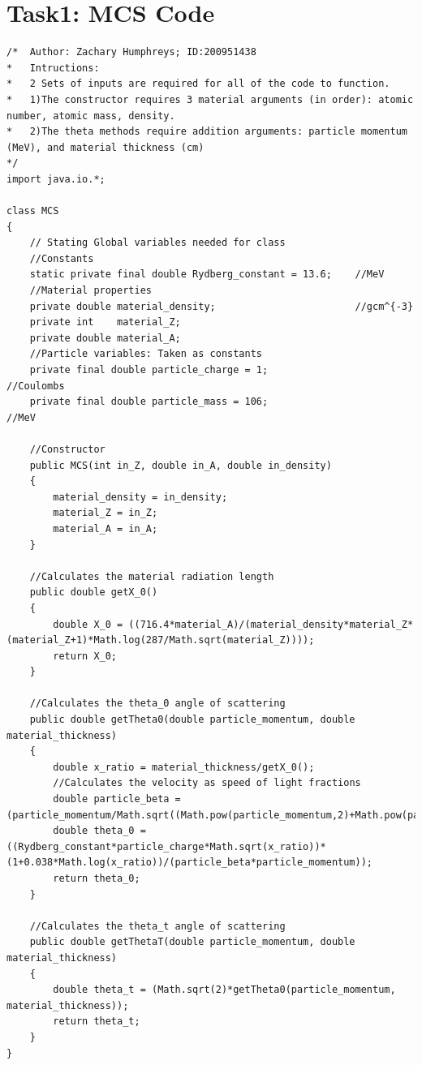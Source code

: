 \documentclass[twocolumn]{article}
\begin{document}
\section{Task1: MCS Code}
\begin{verbatim}
/*  Author: Zachary Humphreys; ID:200951438
*   Intructions: 
*   2 Sets of inputs are required for all of the code to function.
*   1)The constructor requires 3 material arguments (in order): atomic number, atomic mass, density.
*   2)The theta methods require addition arguments: particle momentum (MeV), and material thickness (cm)
*/
import java.io.*;

class MCS
{
	// Stating Global variables needed for class
	//Constants
	static private final double Rydberg_constant = 13.6;    //MeV
	//Material properties
	private double material_density;                        //gcm^{-3}
	private int    material_Z;
	private double material_A;
	//Particle variables: Taken as constants
	private final double particle_charge = 1;                     //Coulombs
	private final double particle_mass = 106;                     //MeV
	
	//Constructor
	public MCS(int in_Z, double in_A, double in_density)
	{
		material_density = in_density;
		material_Z = in_Z;
		material_A = in_A;
	}
	
	//Calculates the material radiation length
	public double getX_0()
	{
		double X_0 = ((716.4*material_A)/(material_density*material_Z*(material_Z+1)*Math.log(287/Math.sqrt(material_Z))));
		return X_0;
	}
	
	//Calculates the theta_0 angle of scattering
	public double getTheta0(double particle_momentum, double material_thickness)
	{
		double x_ratio = material_thickness/getX_0();
		//Calculates the velocity as speed of light fractions
		double particle_beta = (particle_momentum/Math.sqrt((Math.pow(particle_momentum,2)+Math.pow(particle_mass,2))));
		double theta_0 = ((Rydberg_constant*particle_charge*Math.sqrt(x_ratio))*(1+0.038*Math.log(x_ratio))/(particle_beta*particle_momentum));
		return theta_0;
	}
	
	//Calculates the theta_t angle of scattering
	public double getThetaT(double particle_momentum, double material_thickness)
	{
		double theta_t = (Math.sqrt(2)*getTheta0(particle_momentum, material_thickness));
		return theta_t;
	}
}
\end{verbatim}
\end{document}
